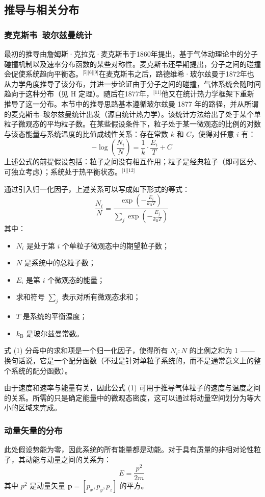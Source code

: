 \subsection{推导与相关分布}
\subsubsection{麦克斯韦–玻尔兹曼统计}
最初的推导由詹姆斯·克拉克·麦克斯韦于1860年提出，基于气体动理论中的分子碰撞机制以及速率分布函数的某些对称性。麦克斯韦还早期提出，分子之间的碰撞会促使系统趋向平衡态。\(^\text{[5][6][9]}\)在麦克斯韦之后，路德维希·玻尔兹曼于1872年也从力学角度推导了该分布，并进一步论证由于分子之间的碰撞，气体系统会随时间趋向于这种分布（见 H 定理）。随后在1877年，\(^\text{[11]}\)他又在统计热力学框架下重新推导了这一分布。本节中的推导思路基本遵循玻尔兹曼 1877 年的路径，并从所谓的麦克斯韦–玻尔兹曼统计出发（源自统计热力学）。该统计方法给出了处于某个单粒子微观态的平均粒子数。在某些假设条件下，粒子处于某一微观态的比例的对数与该态能量与系统温度的比值成线性关系：存在常数 $k$ 和 $C$，使得对任意 $i$ 有：
$$
-\log\left(\frac{N_i}{N}\right) = \frac{1}{k} \cdot \frac{E_i}{T} + C~
$$
上述公式的前提假设包括：粒子之间没有相互作用；粒子是经典粒子（即可区分、可独立考虑）；系统处于热平衡状态。\(^\text{[1][12]}\)

通过引入归一化因子，上述关系可以写成如下形式的等式：
$$
\frac{N_i}{N} = \frac{\exp\left( -\frac{E_i}{k_{\text{B}} T} \right)}{\sum\limits_j \exp\left( -\frac{E_j}{k_{\text{B}} T} \right)} \tag{1}~
$$
其中：
\begin{itemize}
\item $N_i$ 是处于第 $i$ 个单粒子微观态中的期望粒子数；
\item $N$ 是系统中的总粒子数；
\item $E_i$ 是第 $i$ 个微观态的能量；
\item 求和符号 $\sum_j$ 表示对所有微观态求和；
\item $T$ 是系统的平衡温度；
\item $k_{\text{B}}$ 是玻尔兹曼常数。
\end{itemize}
式 (1) 分母中的求和项是一个归一化因子，使得所有 $N_i : N$ 的比例之和为 1 —— 换句话说，它是一个配分函数（不过是针对单粒子系统的，而不是通常意义上的整个系统的配分函数）。

由于速度和速率与能量有关，因此公式 (1) 可用于推导气体粒子的速度与温度之间的关系。所需的只是确定能量中的微观态密度，这可以通过将动量空间划分为等大小的区域来完成。
\subsubsection{动量矢量的分布}
此处假设势能为零，因此系统的所有能量都是动能。对于具有质量的非相对论性粒子，其动能与动量之间的关系为：
$$
E = \frac{p^2}{2m} \tag{2}~
$$
其中 $p^2$ 是动量矢量 $\mathbf{p} = [p_x, p_y, p_z]$ 的平方。

